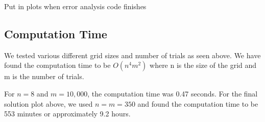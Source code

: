 \documentclass{amsart}
\begin{document}
Put in plots when error analysis code finishes

\subsection{Computation Time}

We tested various different grid sizes and number of trials as seen above. We have found the computation time to be $O(n^4m^2)$ where n is the size of the grid and m is the number of trials.

For $n = 8$ and $m = 10,000$, the computation time was 0.47 seconds. For the final solution plot above, we used $n = m = 350$ and found the computation time to be 553 minutes or approximately 9.2 hours.



\end{document}
